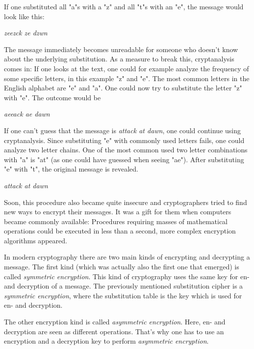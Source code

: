 If one substituted all "a"s with a "z" and all "t"s with an "e", the message
would look like this:

\vspace{0.5cm}
\textit{zeezck ze dzwn}
\vspace{0.5cm}

The message immediately becomes unreadable for someone who doesn't know about
the underlying substitution. As a measure to break this, cryptanalysis comes in:
If one looks
at the text, one could for example analyze the frequency of some specific
letters, in this example "z" and "e". The most common letters in the English
alphabet are "e" and "a". One could now try to substitute the letter "z" with
"e". The outcome would be

\vspace{0.5cm}
\textit{aeeack ae dawn}
\vspace{0.5cm}

If one can't guess that the message is \textit{attack at dawn}, one could
continue using cryptanalysis. Since substituting "e" with commonly used letters
fails, one could analyze two letter chains. One of the most common used two
letter combinations with "a" is "at" (as one could have guessed when seeing
"ae").  After substituting "e" with "t", the original message is revealed.

\vspace{0.5cm}
\textit{attack at dawn}
\vspace{0.5cm}

Soon, this procedure also became quite insecure and cryptographers tried to
find new ways to encrypt their messages. It was a gift for them when computers
became commonly available: Procedures requiring masses of mathematical
operations could be executed in less than a second, more complex encryption
algorithms appeared.

In modern cryptography there are two main kinds of encrypting and decrypting a
message. The first kind (which was actually also the first one that emerged) is
called \textit{symmetric encryption}. This kind of cryptography uses the same
key for en- and decryption of a message. The previously mentioned substitution
cipher is a \textit{symmetric encryption}, where the substitution table is the
key which is used for en- and decryption.

The other encryption kind is called \textit{asymmetric encryption}. Here, en-
and decryption are seen as different operations. That's why one has to use an
encryption and a decryption key to perform \textit{asymmetric encryption}.
\cite{singh2000geheime}

